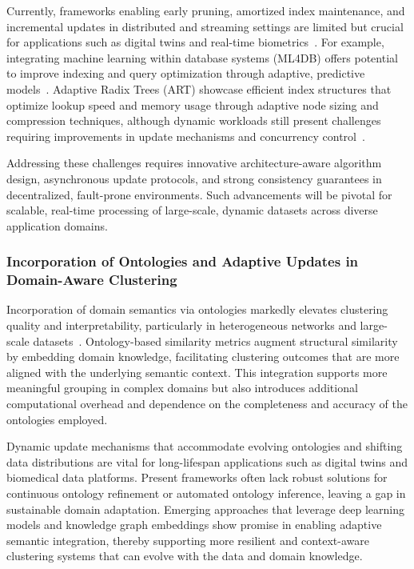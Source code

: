\documentclass[sigconf]{acmart}
\begin{document}
Currently, frameworks enabling early pruning, amortized index maintenance, and incremental updates in distributed and streaming settings are limited but crucial for applications such as digital twins and real-time biometrics~\cite{ref26,ref29}. For example, integrating machine learning within database systems (ML4DB) offers potential to improve indexing and query optimization through adaptive, predictive models~\cite{ref26}. Adaptive Radix Trees (ART) showcase efficient index structures that optimize lookup speed and memory usage through adaptive node sizing and compression techniques, although dynamic workloads still present challenges requiring improvements in update mechanisms and concurrency control~\cite{ref29}. 

Addressing these challenges requires innovative architecture-aware algorithm design, asynchronous update protocols, and strong consistency guarantees in decentralized, fault-prone environments. Such advancements will be pivotal for scalable, real-time processing of large-scale, dynamic datasets across diverse application domains.

\subsubsection{Incorporation of Ontologies and Adaptive Updates in Domain-Aware Clustering}

Incorporation of domain semantics via ontologies markedly elevates clustering quality and interpretability, particularly in heterogeneous networks and large-scale datasets~\cite{ref23}. Ontology-based similarity metrics augment structural similarity by embedding domain knowledge, facilitating clustering outcomes that are more aligned with the underlying semantic context. This integration supports more meaningful grouping in complex domains but also introduces additional computational overhead and dependence on the completeness and accuracy of the ontologies employed.

Dynamic update mechanisms that accommodate evolving ontologies and shifting data distributions are vital for long-lifespan applications such as digital twins and biomedical data platforms. Present frameworks often lack robust solutions for continuous ontology refinement or automated ontology inference, leaving a gap in sustainable domain adaptation. Emerging approaches that leverage deep learning models and knowledge graph embeddings show promise in enabling adaptive semantic integration, thereby supporting more resilient and context-aware clustering systems that can evolve with the data and domain knowledge.
\end{document}
